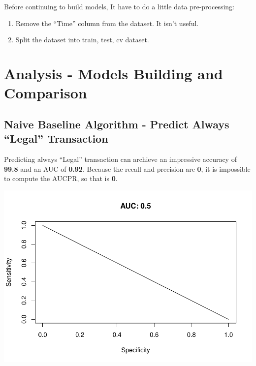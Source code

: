 \documentclass[]{article}
\providecommand{\tightlist}{%
  \setlength{\itemsep}{0pt}\setlength{\parskip}{0pt}}
\begin{document}
Before continuing to build models, It have to do a little data
pre-processing:

\begin{enumerate}
\def\labelenumi{\arabic{enumi}.}
\tightlist
\item
  Remove the ``Time'' column from the dataset. It isn't useful.
\item
  Split the dataset into train, test, cv dataset.
\end{enumerate}

\hypertarget{analysis---models-building-and-comparison}{%
\section{Analysis - Models Building and
Comparison}\label{analysis---models-building-and-comparison}}

\hypertarget{naive-baseline-algorithm---predict-always-legal-transaction}{%
\subsection{Naive Baseline Algorithm - Predict Always ``Legal''
Transaction}\label{naive-baseline-algorithm---predict-always-legal-transaction}}

Predicting always ``Legal'' transaction can archieve an impressive
accuracy of \textbf{99.8} and an AUC of \textbf{0.92}. Because the
recall and precision are \textbf{0}, it is impossible to compute the
AUCPR, so that is \textbf{0}.

\begin{center}\includegraphics{Credit_Card_Fraud_Detection_Project_Report_files/figure-latex/unnamed-chunk-16-1} \end{center}
\end{document}
